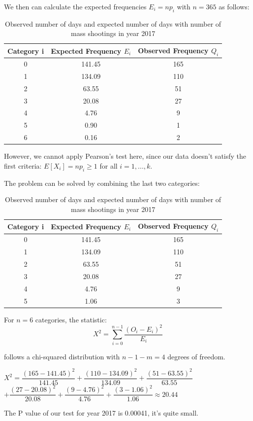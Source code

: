 \documentclass[12pt]{article}
\begin{document}
\par We then can calculate the expected frequencies $E_i=np_i$ with $n=365$ as follows:
\begin{table} [!htbp]
\begin{center}
\begin{tabular*} {14cm} {@{\extracolsep{\fill} }ccc}
\toprule
Category i & Expected Frequency $E_i$ & Observed Frequency $Q_i$ \\
\midrule
0 & 141.45 & 165\\ \hline
1 & 134.09 & 110\\ \hline
2 & 63.55 & 51\\ \hline
3 & 20.08 & 27\\ \hline
4 & 4.76 &  9\\ \hline
5 & 0.90 &  1\\ \hline
6 & 0.16  & 2\\
\bottomrule
\end{tabular*}
\end{center}
\caption{Observed number of days and expected number of days with number of mass shootings in year 2017}
\end{table}
\par However, we cannot apply Pearson's test here, since our data doesn't satisfy the first criteria: $E[X_i]=np_i\geq1$ for all $i=1,...,k$.
\par The problem can be solved by combining the last two categories:
\begin{table} [!htbp]
\begin{center}
\begin{tabular*} {14cm} {@{\extracolsep{\fill} }ccc}
\toprule
Category i & Expected Frequency $E_i$ & Observed Frequency $Q_i$ \\
\midrule
0 & 141.45 & 165\\ \hline
1 & 134.09 & 110\\ \hline
2 & 63.55 & 51\\ \hline
3 & 20.08 & 27\\ \hline
4 & 4.76 &  9\\ \hline
5 & 1.06 &  3\\
\bottomrule
\end{tabular*}
\end{center}
\caption{Observed number of days and expected number of days with number of mass shootings in year 2017}
\end{table}
\par For $n=6$ categories, the statistic:
\begin{equation*}
X^2=\sum_{i=0}^{n-1}\dfrac{(O_i-E_i)^2}{E_i}
\end{equation*}
\par follows a chi-squared distribution with $n-1-m=4$ degrees of freedom.
\begin{center}
$X^2=\dfrac{(165-141.45)^2}{141.45}+\dfrac{(110-134.09)^2}{134.09}+\dfrac{(51-63.55)^2}{63.55}$\\
$+\dfrac{(27-20.08)^2}{20.08}+\dfrac{(9-4.76)^2}{4.76}+\dfrac{(3-1.06)^2}{1.06}\approx20.44$
\end{center}
\par The P value of our test for year 2017 is 0.00041, it's quite small.\\
\end{document}
